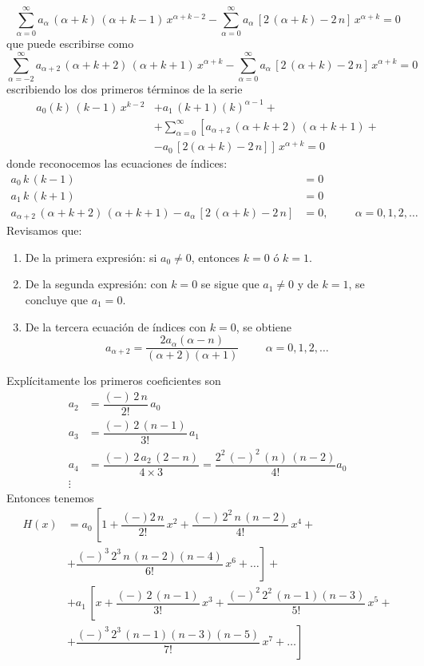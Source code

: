 \[ \sum_{\alpha = 0}^{\infty} a_{\alpha} \, (\alpha + k) \, (\alpha + k - 1) \, x^{\alpha+k-2} - \sum_{\alpha=0}^{\infty} a_{\alpha} \, [ 2 \, (\alpha + k) - 2 \, n] \, x^{\alpha+k} = 0 \]
que puede escribirse como
\[ \sum_{\alpha=-2}^{\infty} a_{\alpha + 2} \, ( \alpha + k + 2) \, (\alpha + k + 1)\, x^{\alpha+k} - \sum_{\alpha=0}^{\infty} a_{\alpha} \, [2 \, (\alpha + k) - 2 \, n] \, x^{\alpha+k} = 0 \]
escribiendo los dos primeros términos de la serie
\begin{align*}
 a_{0}(k) \, (k - 1)\, x^{k-2} &+ a_{1} \, (k + 1)(k)^{\alpha-1} + \\
&+ \sum_{\alpha=0}^{\infty} \left[ a_{\alpha + 2} \, (\alpha + k +2) \, (\alpha + k + 1) + \right. \\
&- \left. a_{0} \, [2 (\alpha + k ) - 2 \, n] \right] \, x^{\alpha+k} = 0 
\end{align*}
donde reconocemos las ecuaciones de índices:
\begin{align*}
a_{0}\, k \, (k-1) &= 0 \\
a_{1} \, k\, (k+1) &= 0 \\
a_{\alpha+2}\, (\alpha + k + 2) \, (\alpha + k + 1) - a_{\alpha} \, [2 \, (\alpha + k) - 2 \, n] &= 0, \hspace{1cm} \alpha=0, 1, 2, \ldots
\end{align*}
Revisamos que:
\begin{enumerate}
\item De la primera expresión: si $a_{0} \neq 0$, entonces $k=0$ ó $k=1$.
\item De la segunda expresión: con $k=0$ se sigue que $a_{1} \neq 0$ y de $k=1$, se concluye que $a_{1} = 0$.
\item De la tercera ecuación de índices con $k=0$, se obtiene
\[ a_{\alpha+2} = \dfrac{2a_{\alpha}(\alpha - n)}{(\alpha + 2)(\alpha + 1)} \hspace{1cm} \alpha = 0, 1, 2, \ldots \]
\end{enumerate}
Explícitamente los primeros coeficientes son
\begin{align*}
a_{2} &= \dfrac{(-) \, 2 \, n}{2!} \, a_{0} \\
a_{3} &= \dfrac{(-) \, 2 \, (n-1)}{3!} \, a_{1} \\
a_{4} &= \dfrac{(-) \, 2 \, a_{2} \, (2 - n)}{4 \times 3} = \dfrac{2^{2} \, (-)^{2} \, (n) \, (n - 2)}{4!} a_{0} \\
\vdots
\end{align*}
Entonces tenemos
\begin{align*}
H(x) &= a_{0} \, \left[ 1 + \dfrac{(-) 2 \, n}{2!}\, x^{2} + \dfrac{(-) \, 2^{2} \, n \, (n - 2)}{4!}\, x^{4} + \right. \\
&+ \left. \dfrac{(-)^{3} \, 2^{3} \, n \, (n-2)(n-4) }{6!}\, x^{6} + \ldots \right] + \\
&+ a_{1} \, \left[ x + \dfrac{(-) \, 2 \, (n-1)}{3!} \, x^{3} + \dfrac{(-)^{2} \, 2^{2} \, (n-1)(n-3)}{5!}\, x^{5} + \right.\\
&+ \left. \dfrac{(-)^{3} \, 2^{3} \, (n-1)(n-3)(n-5)}{7!} \, x^{7} + \ldots \right]
\end{align*}
